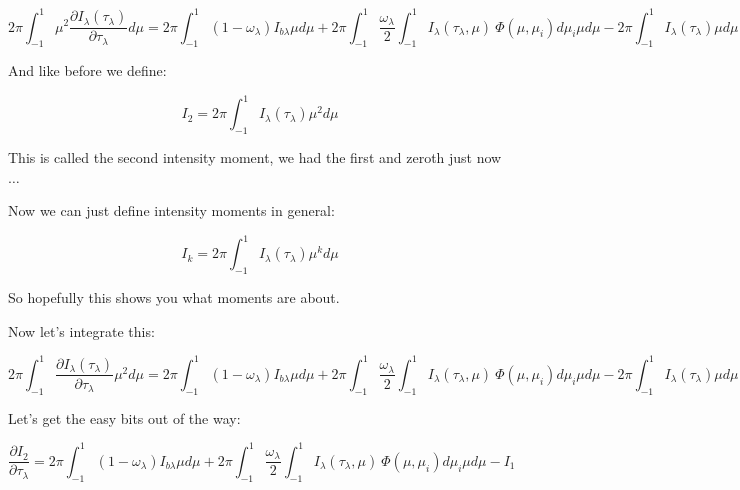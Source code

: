 \documentclass[12pt]{article}
\renewcommand{\_}{\kern-1.5pt\textunderscore\kern-1.5pt}
\begin{document}
\begin{itemize}
 \[ 2 \pi  \int _{-1}^{1} \mu ^{2}\frac{ \partial I_{ \lambda } \left(  \tau_{ \lambda } \right) }{ \partial  \tau_{ \lambda }}d \mu =2 \pi  \int _{-1}^{1} \left( 1- \omega _{ \lambda } \right) I_{b \lambda } \mu  d \mu +2 \pi  \int _{-1}^{1}\frac{ \omega _{ \lambda }}{2} \int _{-1}^{1}I_{ \lambda } \left(  \tau_{ \lambda }, \mu  \right) ~ \Phi  \left(  \mu , \mu _{i} \right) d \mu _{i} \mu  d \mu -2 \pi  \int _{-1}^{1}I_{ \lambda } \left(  \tau_{ \lambda } \right)   \mu  d \mu  \] \par

And like before we define:\par

 \[ I_{2}=2 \pi  \int _{-1}^{1}I_{ \lambda } \left(  \tau_{ \lambda } \right)  \mu ^{2} d \mu  \] \par

This is called the second intensity moment, we had the first and zeroth just now$ \ldots $ \par

Now we can just define intensity moments in general:\par

 \[ I_{k}=2 \pi   \int _{-1}^{1}I_{ \lambda } \left(  \tau_{ \lambda } \right)  \mu ^{k} d \mu  \] \par

So hopefully this shows you what moments are about. \par

Now let’s integrate this:\par


\vspace{\baselineskip}
 \[ 2 \pi  \int _{-1}^{1}\frac{ \partial I_{ \lambda } \left(  \tau_{ \lambda } \right) }{ \partial  \tau_{ \lambda }} \mu ^{2} d \mu =2 \pi  \int _{-1}^{1} \left( 1- \omega _{ \lambda } \right) I_{b \lambda }  \mu  d \mu +2 \pi  \int _{-1}^{1}\frac{ \omega _{ \lambda }}{2} \int _{-1}^{1}I_{ \lambda } \left(  \tau_{ \lambda }, \mu  \right) ~ \Phi  \left(  \mu , \mu _{i} \right) d \mu _{i} \mu  d \mu -2 \pi  \int _{-1}^{1}I_{ \lambda } \left(  \tau_{ \lambda } \right)  \mu  d \mu  \] \par

Let’s get the easy bits out of the way:\par

 \[ \frac{ \partial I_{2}}{ \partial  \tau_{ \lambda }}=2 \pi  \int _{-1}^{1} \left( 1- \omega _{ \lambda } \right) I_{b \lambda }  \mu  d \mu +2 \pi  \int _{-1}^{1}\frac{ \omega _{ \lambda }}{2} \int _{-1}^{1}I_{ \lambda } \left(  \tau_{ \lambda }, \mu  \right) ~ \Phi  \left(  \mu , \mu _{i} \right) d \mu _{i} \mu  d \mu -I_{1} \] \par



\end{itemize}
\end{document}
